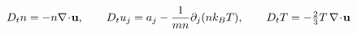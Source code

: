 \documentclass[preview]{standalone}
\begin{document}
\begin{align*}
\special{dvisvgm:raw <g id='unique000'>}D_tn=-n\nabla\!\cdot\!\va u,\qquad D_tu_j=a_j-\frac{1}{mn}\partial_j(nk_BT),\qquad D_tT=-\tfrac23T\,\nabla\!\cdot\!\va u\special{dvisvgm:raw </g>}
\end{align*}
\end{document}
